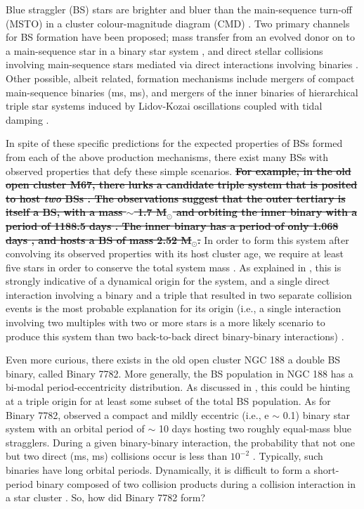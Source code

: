 \documentclass{aastex62}
\def\del#1{{\bf {\sout{#1}}}}
\begin{document}
Blue straggler (BS) stars are brighter and bluer than the
main-sequence turn-off (MSTO) in a cluster colour-magnitude diagram
(CMD) \citep[e.g.][]{1953AJ.....58...61S,simunovic14,simunovic16}.
Two primary channels for BS formation have been proposed; mass
transfer from an evolved donor on to a main-sequence star in a binary
star system
\citep[e.g.][]{mccrea64,997A&A...328..143P,knigge09,mathieu09,leigh11,geller11,geller12,gosnell14,gosnell15},
and direct stellar collisions involving main-sequence stars mediated
via direct interactions involving binaries
\citep[e.g.][]{hills75,1997A&A...328..130P,shara97,leigh07,leigh11,leigh13,hypki13,2018arXiv181100058P}.
Other possible, albeit related, formation mechanisms include mergers
of compact main-sequence binaries (ms, ms), and mergers of the inner
binaries of hierarchical triple star systems induced by Lidov-Kozai
oscillations coupled with tidal damping \citep[e.g.][]{perets09}.

In spite of these specific predictions for the expected properties of
BSs formed from each of the above production mechanisms, there exist
many BSs with observed properties that defy these simple scenarios.
\del{For example, in the old open cluster M67, there lurks a candidate
  triple system that is posited to host \textit{two} BSs
  \citep{vandenberg01,sandquist03}.  The observations suggest that the
  outer tertiary is itself a BS, with a mass $\sim$ 1.7 M$_{\odot}$
  and orbiting the inner binary with a period of 1188.5 days
  \citep{sandquist03}.  The inner binary has a period of only 1.068
  days \citep{vandenberg01}, and hosts a BS of mass 2.52 M$_{\odot}$.}
In order to form this system after convolving its observed properties
with its host cluster age, we require at least five stars in order to
conserve the total system mass \citep{leigh11}.  As explained in
\citet{leigh11}, this is strongly indicative of a dynamical origin for
the system, and a single direct interaction involving a binary and a
triple that resulted in two separate collision events is the most
probable explanation for its origin (i.e., a single interaction
involving two multiples with two or more stars is a more likely
scenario to produce this system than two back-to-back direct
binary-binary interactions) \citep{2004MNRAS.350..615G}.

Even more curious, there exists in the old open cluster NGC 188 a
double BS binary, called Binary 7782.  More generally, the BS population in NGC 188 has a bi-modal period-eccentricity distribution.  As discussed in \citet{leigh11}, this could be hinting at a triple origin for at least some subset of the total BS population.  As for Binary 7782, \citet{mathieu09}
observed a compact and mildly eccentric (i.e., e $\sim$ 0.1) binary
star system with an orbital period of $\sim$ 10 days hosting two roughly equal-mass blue
stragglers.  During a given binary-binary interaction, the probability
that not one but two direct (ms, ms) collisions occur is less than
$10^{-2}$ \citep{leonard89,leigh11,leigh12}.  Typically, such binaries
have long orbital periods. Dynamically, it is difficult to form a
short-period binary composed of two collision products during a
collision interaction in a star cluster \citep{2011Sci...334.1380F}.
So, how did Binary 7782 form?  
\end{document}
